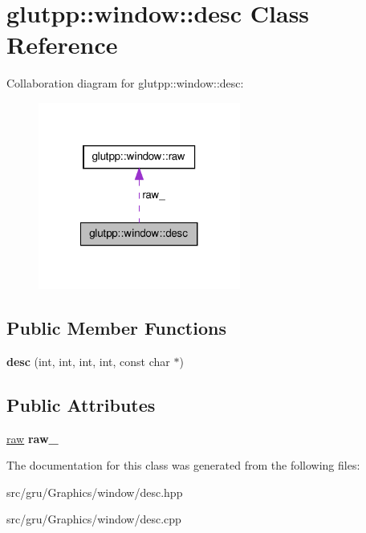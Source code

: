 \hypertarget{classglutpp_1_1window_1_1desc}{\section{glutpp\-:\-:window\-:\-:desc \-Class \-Reference}
\label{classglutpp_1_1window_1_1desc}
}


\-Collaboration diagram for glutpp\-:\-:window\-:\-:desc\-:\nopagebreak
\begin{figure}[H]
\begin{center}
\leavevmode
\includegraphics[width=188pt]{classglutpp_1_1window_1_1desc__coll__graph}
\end{center}
\end{figure}
\subsection*{\-Public \-Member \-Functions}
\begin{DoxyCompactItemize}
\item 
\hypertarget{classglutpp_1_1window_1_1desc_ab63aad03d901472bc8fcaffce4dc84de}{{\bfseries desc} (int, int, int, int, const char $\ast$)}\label{classglutpp_1_1window_1_1desc_ab63aad03d901472bc8fcaffce4dc84de}

\end{DoxyCompactItemize}
\subsection*{\-Public \-Attributes}
\begin{DoxyCompactItemize}
\item 
\hypertarget{classglutpp_1_1window_1_1desc_ae879e3451cc166a1c28b164f88904698}{\hyperlink{structglutpp_1_1window_1_1raw}{raw} {\bfseries raw\-\_\-}}\label{classglutpp_1_1window_1_1desc_ae879e3451cc166a1c28b164f88904698}

\end{DoxyCompactItemize}


\-The documentation for this class was generated from the following files\-:\begin{DoxyCompactItemize}
\item 
src/gru/\-Graphics/window/desc.\-hpp\item 
src/gru/\-Graphics/window/desc.\-cpp\end{DoxyCompactItemize}
